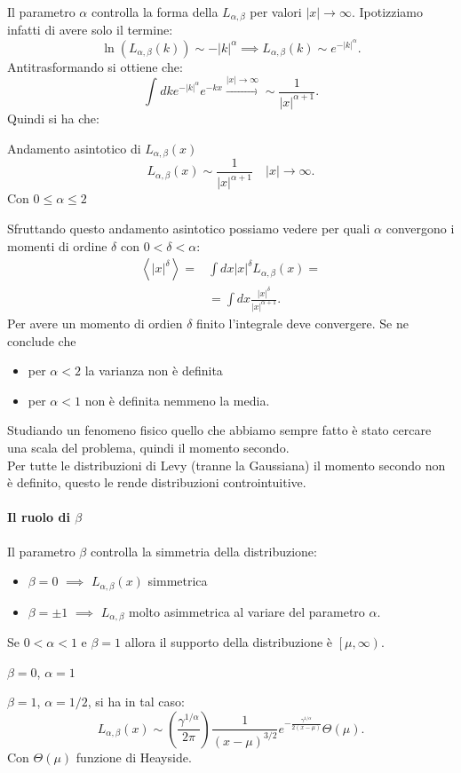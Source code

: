 Il parametro $\alpha$ controlla la forma della $L_{\alpha,\beta  }$ per valori $\left|x\right|\to \infty$. Ipotizziamo infatti di avere solo il termine:
\[
    \ln (L_{\alpha,\beta  }(k) ) \sim -\left|k\right|^\alpha \implies  L_{\alpha, \beta  }(k) \sim e^{-\left|k\right|^\alpha}
.\] 
Antitrasformando si ottiene che:
\[
    \int_{}^{} dk e^{-\left|k\right|^\alpha} e^{-kx} \xrightarrow[]{\left|x\right|\to \infty} \sim \frac{1}{\left|x\right|^{\alpha +1}}
.\] 
Quindi si ha che:
\begin{bluebox}{Andamento asintotico di $L_{\alpha,\beta  }(x)$}
   \[
       L_{\alpha,\beta  }(x) \sim \frac{1}{\left|x\right|^{\alpha +1}} \quad \left|x\right|\to \infty
   .\]  
   Con $0\le  \alpha \le 2$ 
\end{bluebox}
\noindent
Sfruttando questo andamento asintotico possiamo vedere per quali $\alpha$ convergono i momenti di ordine $\delta$ con $0<\delta <\alpha$:
\[\begin{aligned}
    \left<\left|x\right|^\delta\right> = & \int dx \left|x\right|^\delta L_{\alpha,\beta  }(x) =\\
					 & = \int  dx \frac{\left|x\right|^\delta}{\left|x\right|^{\alpha +1}}
.\end{aligned}\]
Per avere un momento di ordien $\delta$ finito l'integrale deve convergere.
Se ne conclude che 
\begin{itemize}
    \item per $\alpha <2$ la varianza non è definita
    \item per $\alpha <1$ non è definita nemmeno la media.
\end{itemize}
Studiando un fenomeno fisico quello che abbiamo sempre fatto è stato cercare una scala del problema, quindi il momento secondo. \\
Per tutte le distribuzioni di Levy (tranne la Gaussiana) il momento secondo non è definito, questo le rende distribuzioni controintuitive.
\paragraph{Il ruolo di $\beta  $}%
\label{par:Il ruolo di beta}
Il parametro $\beta  $   controlla la simmetria della distribuzione:
\begin{itemize}
    \item $\beta =0$ $\implies$ $L_{\alpha,\beta  }(x) $ simmetrica
    \item $\beta  = \pm 1$ $\implies$ $L_{\alpha,\beta  }$ molto asimmetrica al variare del parametro $\alpha$. 
\end{itemize}
Se $0<\alpha <1$ e $\beta =1$ allora il supporto della distribuzione è $\left[\mu,\infty\right)$.
\begin{exmp}[Lorentziana]
    $\beta =0$, $\alpha =1$ 
\end{exmp}
\noindent
\begin{exmp}
    $\beta =1$, $\alpha =1 /2$, si ha in tal caso:
    \[
	L_{\alpha,\beta  }(x) \sim \left(\frac{\gamma^{1 /\alpha}}{2\pi}\right) 
	\frac{1}{\left(x-\mu\right)^{3 /2}} e^{-\frac{\gamma^{1 /\alpha}}{2\left(x-\mu\right)}} \Theta (\mu) 
    .\] 
    Con $\Theta (\mu) $ funzione di Heayside.
\end{exmp}
\noindent
